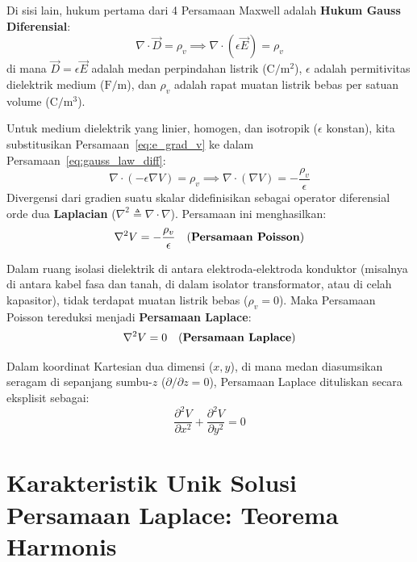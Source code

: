 \documentclass[11pt,a4paper]{article}
\theoremstyle{definition}
\begin{document}
Di sisi lain, hukum pertama dari 4 Persamaan Maxwell adalah \textbf{Hukum Gauss Diferensial}:
\begin{equation}
    \nabla \cdot \vec{D} = \rho_v \implies \nabla \cdot (\epsilon \vec{E}) = \rho_v
    \label{eq:gauss_law_diff}
\end{equation}
di mana $\vec{D} = \epsilon \vec{E}$ adalah medan perpindahan listrik ($\text{C}/\text{m}^2$), $\epsilon$ adalah permitivitas dielektrik medium ($\text{F}/\text{m}$), dan $\rho_v$ adalah rapat muatan listrik bebas per satuan volume ($\text{C}/\text{m}^3$).

Untuk medium dielektrik yang linier, homogen, dan isotropik ($\epsilon$ konstan), kita substitusikan Persamaan~\eqref{eq:e_grad_v} ke dalam Persamaan~\eqref{eq:gauss_law_diff}:
\begin{equation}
    \nabla \cdot (-\epsilon \nabla V) = \rho_v \implies \nabla \cdot (\nabla V) = -\frac{\rho_v}{\epsilon}
\end{equation}
Divergensi dari gradien suatu skalar didefinisikan sebagai operator diferensial orde dua \textbf{Laplacian} ($\nabla^2 \triangleq \nabla \cdot \nabla$). Persamaan ini menghasilkan:
\begin{equation}
    \nabla^2 V = -\frac{\rho_v}{\epsilon} \quad \text{(\textbf{Persamaan Poisson})}
    \label{eq:poisson_equation}
\end{equation}

Dalam ruang isolasi dielektrik di antara elektroda-elektroda konduktor (misalnya di antara kabel fasa dan tanah, di dalam isolator transformator, atau di celah kapasitor), tidak terdapat muatan listrik bebas ($\rho_v = 0$). Maka Persamaan Poisson tereduksi menjadi \textbf{Persamaan Laplace}:
\begin{equation}
    \nabla^2 V = 0 \quad \text{(\textbf{Persamaan Laplace})}
    \label{eq:laplace_equation}
\end{equation}

Dalam koordinat Kartesian dua dimensi ($x, y$), di mana medan diasumsikan seragam di sepanjang sumbu-$z$ ($\partial/\partial z = 0$), Persamaan Laplace dituliskan secara eksplisit sebagai:
\begin{equation}
    \frac{\partial^2 V}{\partial x^2} + \frac{\partial^2 V}{\partial y^2} = 0
    \label{eq:laplace_2d_cartesian}
\end{equation}

\section{Karakteristik Unik Solusi Persamaan Laplace: Teorema Harmonis}
\end{document}

